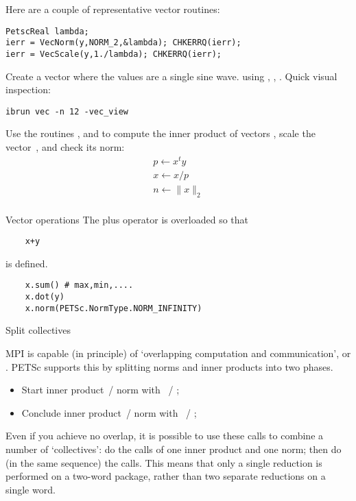Here are a couple of representative vector routines:
\begin{lstlisting}
PetscReal lambda;
ierr = VecNorm(y,NORM_2,&lambda); CHKERRQ(ierr);
ierr = VecScale(y,1./lambda); CHKERRQ(ierr);  
\end{lstlisting}

\begin{exercise}
  Create a vector where the values are a single sine wave.
  using , ,
  .
  Quick visual inspection:
\begin{verbatim}
ibrun vec -n 12 -vec_view
\end{verbatim}
\end{exercise}

\begin{exercise}
Use the routines , 
and  to compute the inner product of vectors
, scale the vector~, and check its norm:
\[
\begin{array}{l}
p \leftarrow x^ty\\
x \leftarrow x/p\\
n \leftarrow \|x\|_2\\
\end{array}
\]
\end{exercise}

\begin{pythonnote}{Vector operations}
  The plus operator is overloaded so that
  \begin{lstlisting}
    x+y
  \end{lstlisting}
  is defined.
  \begin{lstlisting}
    x.sum() # max,min,....
    x.dot(y)
    x.norm(PETSc.NormType.NORM_INFINITY)
  \end{lstlisting}
\end{pythonnote}

 {Split collectives}

MPI is capable (in principle) of `overlapping computation and communication',
or . PETSc supports this
by splitting norms and inner products into two phases.
\begin{itemize}
\item Start inner product~/ norm with ~/
  ;
\item Conclude inner product~/ norm with ~/
  ;
\end{itemize}
Even if you achieve no overlap, it is possible to use these calls to
combine a number of `collectives': do the  calls of one inner
product and one norm; then do (in the same sequence) the  calls.
This means that only a single reduction is performed on a two-word
package, rather than two separate reductions on a single word.

